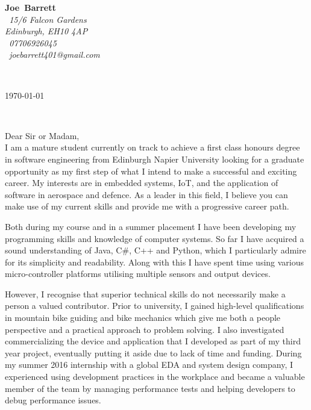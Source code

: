 \documentclass{article}
\makeatletter
\def\firstname{Joe}
\def\surname{Barrett}
\def\address{\faMapMarker~15/6 Falcon Gardens\\Edinburgh, EH10 4AP\\}
\def\phone{\faMobilePhone~07706926045}
\def\email{\faEnvelopeO~joebarrett401@gmail.com}
\def\FileAuthor{\firstname\ \surname}
\def\compName{}
\def\compAddress{}
\makeatother
\begin{document}
	\hfill%
\begin{minipage}[t]{.6\textwidth}
	\raggedleft%
	{\bfseries \FileAuthor}\\[.35ex]
	\small\itshape%
	\address[.35ex]
	\phone\\
	\email

\end{minipage}\\[1em]
%
\begin{minipage}[t]{.4\textwidth}
	\raggedright%
	{\bfseries \compName}
	\small\itshape%
	\compAddress
\end{minipage}
\hfill
\begin{minipage}[t]{.4\textwidth}
	\hfill
	\raggedleft
	\today
\end{minipage}\\[2em]
\raggedright
Dear Sir or Madam,\\[1.5em]
%

I am a mature student currently on track to achieve a first class honours degree in software engineering from Edinburgh Napier University looking for a graduate opportunity as my first step of what I intend to make a successful and exciting career. My interests are in embedded systems, IoT, and the application of software in aerospace and defence. As a leader in this field, I believe you can make use of my current skills and provide me with a progressive career path.

Both during my course and in a summer placement I have been developing my programming skills and knowledge of computer systems. So far I have acquired a sound understanding of Java, C\#, C++ and Python, which I particularly admire for its simplicity and readability. Along with this I have spent time using various micro-controller platforms utilising multiple sensors and output devices.

However, I recognise that superior technical skills do not necessarily make a person a valued contributor. Prior to university, I gained high-level qualifications in mountain bike guiding and bike mechanics which give me both a people perspective and a practical approach to problem solving. I also investigated commercializing the device and application that I developed as part of my third year project, eventually putting it aside due to lack of time and funding. During my summer 2016 internship with a global EDA and system design company, I experienced using development practices in the workplace and became a valuable member of the team by managing performance tests and helping developers to debug performance issues.
\end{document}
